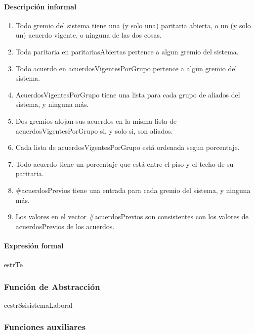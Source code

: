 \paragraph{Descripción informal}
\begin{enumerate}

	\item Todo gremio del sistema tiene una (y solo una) paritaria abierta, o un (y solo un) acuerdo vigente, o ninguna de las dos cosas.
	\item Toda paritaria en paritariasAbiertas pertence a algun gremio del sistema.
	\item Todo acuerdo en acuerdosVigentesPorGrupo pertence a algun gremio del sistema.
	\item AcuerdosVigentesPorGrupo tiene una lista para cada grupo de aliados del sistema, y ninguna más.
	\item Dos gremios alojan sus acuerdos en la misma lista de acuerdosVigentesPorGrupo si, y solo si, son aliados.
	\item Cada lista de acuerdosVigentesPorGrupo está ordenada segun porcentaje.
	\item Todo acuerdo tiene un porcentaje que está entre el piso y el techo de su paritaria.
	\item \#acuerdosPrevios tiene una entrada para cada gremio del sistema, y ninguna más.
	\item Los valores en el vector \#acuerdosPrevios son consistentes con los valores de acuerdosPrevios de los acuerdos.

\end{enumerate}

\paragraph{Expresión formal}
\begin{RepFormal}{estrT}{e}
\end{RepFormal}

\subsubsection{Funci\'on de Abstracci\'on}

\begin{FunAbsDescriptiva}{e}{estrS}{si}{sistemaLaboral}


\end{FunAbsDescriptiva}

\subsubsection{Funciones auxiliares}
